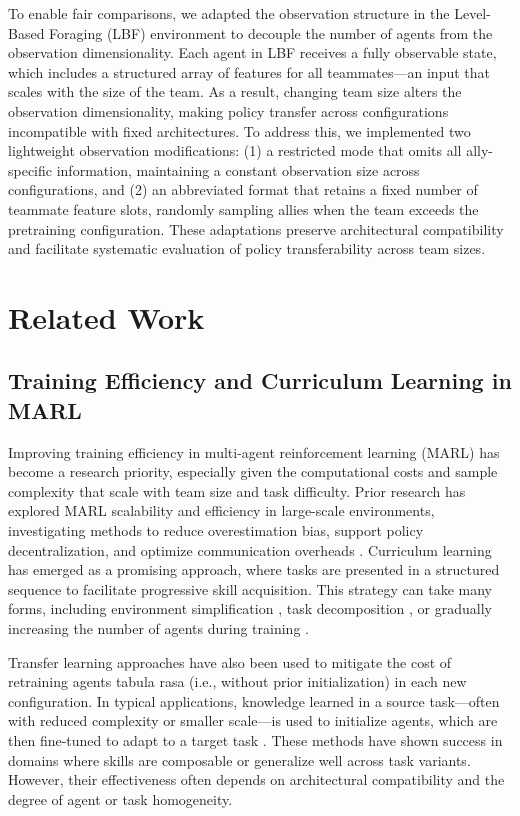 \documentclass{article}
\begin{document}
To enable fair comparisons, we adapted the observation structure in the Level-Based Foraging (LBF) 
environment to decouple the number of agents from the observation dimensionality. 
Each agent in LBF receives a fully observable state, which includes a structured array of 
features for all teammates—an input that scales with the size of the team. As a result, changing 
team size alters the observation dimensionality, making policy transfer across configurations 
incompatible with fixed architectures. To address this, we implemented two lightweight 
observation modifications: (1) a restricted mode that omits all ally-specific information, 
maintaining a constant observation size across configurations, 
and (2) an abbreviated format that retains a fixed number of teammate feature slots, 
randomly sampling allies when the team exceeds the pretraining configuration. 
These adaptations preserve architectural compatibility and facilitate systematic 
evaluation of policy transferability across team sizes.


\section{Related Work}

\subsection{Training Efficiency and Curriculum Learning in MARL}

Improving training efficiency in multi-agent reinforcement learning (MARL) has become a research 
priority, especially given the computational costs and sample complexity that scale with team 
size and task difficulty. Prior research has explored MARL scalability and efficiency in 
large-scale environments, investigating methods to reduce overestimation bias, 
support policy decentralization, and optimize communication overheads 
\cite{shoham2007a, busoniu2008, foerster2017, ackermann2019, lowe2020}.
Curriculum learning has emerged as a promising approach, where tasks are presented in a structured 
sequence to facilitate progressive skill acquisition. This strategy can take many forms, 
including environment simplification \cite{shukla2022}, task decomposition \cite{shi2023}, 
or gradually increasing the number of agents during training \cite{smit2023, albrecht2024}.

Transfer learning approaches have also been used to mitigate the cost of retraining agents 
tabula rasa (i.e., without prior initialization) in each new configuration. 
In typical applications, knowledge learned in a source task—often with reduced 
complexity or smaller scale—is used to initialize agents, 
which are then fine-tuned to adapt to a target task \cite{cui2022}. 
These methods have shown success in domains where skills are composable 
or generalize well across task variants. However, their effectiveness often 
depends on architectural compatibility and the degree of agent or task homogeneity.
\end{document}
